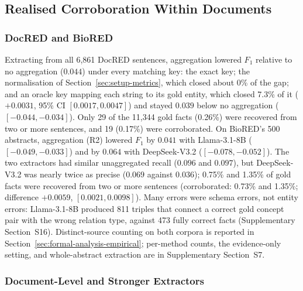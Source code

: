 \documentclass[preprint,12pt,authoryear]{elsarticle}
\begin{document}
\subsection{Realised Corroboration Within Documents}
\label{sec:results-within}

\subsubsection{DocRED and BioRED}
\label{sec:results-docred}
\label{sec:results-biored}

Extracting from all 6,861 DocRED sentences, aggregation lowered $F_1$
relative to no aggregation ($0.044$) under every matching key: the exact
key; the normalisation of Section~\ref{sec:setup-metrics}, which closed
about 0\% of the gap; and an oracle key mapping each string to its gold
entity, which closed 7.3\% of it ($+0.0031$, 95\% CI $[0.0017,\allowbreak 0.0047]$)
and stayed $0.039$ below no aggregation ($[-0.044,\allowbreak -0.034]$). Only 29 of
the 11,344 gold facts (0.26\%) were recovered from two or more sentences,
and 19 (0.17\%) were corroborated. On BioRED's 500 abstracts, aggregation
(R2) lowered $F_1$ by $0.041$ with Llama-3.1-8B ($[-0.049,\allowbreak -0.033]$) and
by $0.064$ with DeepSeek-V3.2 ($[-0.078,\allowbreak -0.052]$). The two extractors had
similar unaggregated recall ($0.096$ and $0.097$), but DeepSeek-V3.2 was
nearly twice as precise ($0.069$ against $0.036$); 0.75\% and 1.35\% of
gold facts were recovered from two or more sentences (corroborated: 0.73\%
and 1.35\%; difference $+0.0059$, $[0.0021,\allowbreak 0.0098]$). Many errors were
schema errors, not entity errors: Llama-3.1-8B produced 811 triples that
connect a correct gold concept pair with the wrong relation type, against
473 fully correct facts (Supplementary Section~S16). Distinct-source
counting on both corpora is reported in
Section~\ref{sec:formal-analysis-empirical}; per-method counts, the
evidence-only setting, and whole-abstract extraction are in
Supplementary Section~S7.

\subsubsection{Document-Level and Stronger Extractors}
\label{sec:results-protocol}
\end{document}
